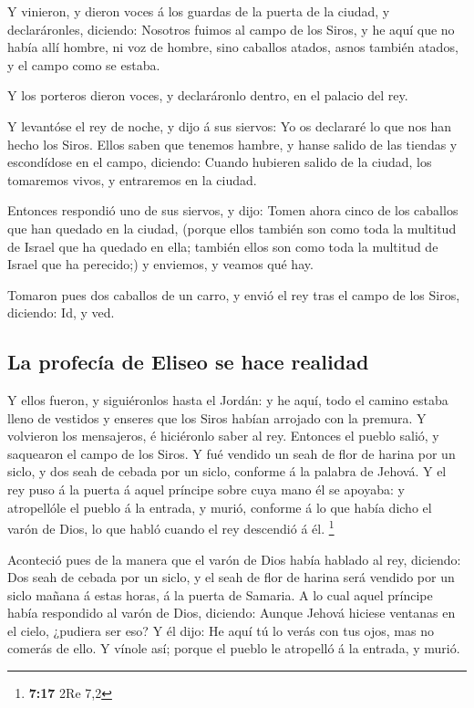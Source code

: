  Y vinieron, y dieron voces á los guardas de la puerta de
la ciudad, y declaráronles, diciendo: Nosotros fuimos al campo de los
Siros, y he aquí que no había allí hombre, ni voz de hombre, sino
caballos atados, asnos también atados, y el campo como se estaba.

 Y los porteros dieron voces, y declaráronlo dentro, en el
palacio del rey.

 Y levantóse el rey de noche, y dijo á sus siervos: Yo os
declararé lo que nos han hecho los Siros. Ellos saben que tenemos
hambre, y hanse salido de las tiendas y escondídose en el campo,
diciendo: Cuando hubieren salido de la ciudad, los tomaremos vivos, y
entraremos en la ciudad.

 Entonces respondió uno de sus siervos, y dijo: Tomen ahora
cinco de los caballos que han quedado en la ciudad, (porque ellos
también son como toda la multitud de Israel que ha quedado en ella;
también ellos son como toda la multitud de Israel que ha perecido;) y
enviemos, y veamos qué hay.

 Tomaron pues dos caballos de un carro, y envió el rey tras
el campo de los Siros, diciendo: Id, y ved.

\hypertarget{la-profecuxeda-de-eliseo-se-hace-realidad}{%
\subsection{La profecía de Eliseo se hace
realidad}\label{la-profecuxeda-de-eliseo-se-hace-realidad}}

 Y ellos fueron, y siguiéronlos hasta el Jordán: y he aquí,
todo el camino estaba lleno de vestidos y enseres que los Siros habían
arrojado con la premura. Y volvieron los mensajeros, é hiciéronlo saber
al rey.  Entonces el pueblo salió, y saquearon el campo de
los Siros. Y fué vendido un seah de flor de harina por un siclo, y dos
seah de cebada por un siclo, conforme á la palabra de Jehová.
 Y el rey puso á la puerta á aquel príncipe sobre cuya mano
él se apoyaba: y atropellóle el pueblo á la entrada, y murió, conforme á
lo que había dicho el varón de Dios, lo que habló cuando el rey
descendió á él. \footnote{\textbf{7:17} 2Re 7,2}

 Aconteció pues de la manera que el varón de Dios había
hablado al rey, diciendo: Dos seah de cebada por un siclo, y el seah de
flor de harina será vendido por un siclo mañana á estas horas, á la
puerta de Samaria.  A lo cual aquel príncipe había
respondido al varón de Dios, diciendo: Aunque Jehová hiciese ventanas en
el cielo, ¿pudiera ser eso? Y él dijo: He aquí tú lo verás con tus ojos,
mas no comerás de ello.  Y vínole así; porque el pueblo le
atropelló á la entrada, y murió.

